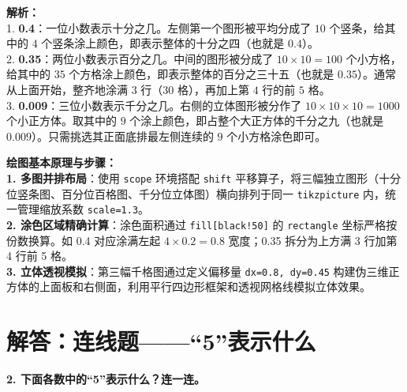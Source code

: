 \vspace{0.6cm}
{\small\color{gray}
\textbf{解析：}\\
1. \textbf{0.4}：一位小数表示十分之几。左侧第一个图形被平均分成了 $10$ 个竖条，给其中的 $4$ 个竖条涂上颜色，即表示整体的十分之四（也就是 $0.4$）。\\
2. \textbf{0.35}：两位小数表示百分之几。中间的图形被分成了 $10 \times 10 = 100$ 个小方格，给其中的 $35$ 个方格涂上颜色，即表示整体的百分之三十五（也就是 $0.35$）。通常从上面开始，整齐地涂满 $3$ 行（$30$ 格），再加上第 $4$ 行的前 $5$ 格。\\
3. \textbf{0.009}：三位小数表示千分之几。右侧的立体图形被分作了 $10 \times 10 \times 10 = 1000$ 个小正方体。取其中的 $9$ 个涂上颜色，即占整个大正方体的千分之九（也就是 $0.009$）。只需挑选其正面底排最左侧连续的 $9$ 个小方格涂色即可。
}

\vspace{0.6cm}

{\small\color{blue!70!black}
\textbf{绘图基本原理与步骤：}\\
\textbf{1. 多图并排布局}：使用 \texttt{scope} 环境搭配 \texttt{shift} 平移算子，将三幅独立图形（十分位竖条图、百分位百格图、千分位立体图）横向排列于同一 \texttt{tikzpicture} 内，统一管理缩放系数 \texttt{scale=1.3}。\\
\textbf{2. 涂色区域精确计算}：涂色面积通过 \texttt{fill[black!50]} 的 \texttt{rectangle} 坐标严格按份数换算。如 0.4 对应涂满左起 $4 \times 0.2 = 0.8$ 宽度；0.35 拆分为上方满 3 行加第 4 行前 5 格。\\
\textbf{3. 立体透视模拟}：第三幅千格图通过定义偏移量 \texttt{dx=0.8, dy=0.45} 构建伪三维正方体的上面板和右侧面，利用平行四边形框架和透视网格线模拟立体效果。
}



\section{解答：连线题——“5”表示什么}

\vspace{0.4cm}

\noindent\textbf{2. 下面各数中的“5”表示什么？连一连。}

\vspace{0.8cm}

